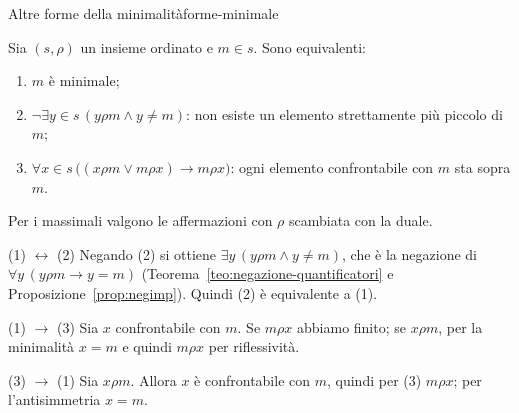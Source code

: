 \begin{concetto}
\begin{Proposizione}{Altre forme della minimalità}{forme-minimale}
    \begin{prerequisiti}
    \end{prerequisiti}
    Sia $(s, \rho)$ un insieme ordinato e $m \in s$. Sono equivalenti:
    \begin{enumerate}
        \item $m$ è minimale;
        \item $\neg\exists y \in s\,(y \rho m \wedge y \neq m)$: non esiste un elemento strettamente più piccolo di $m$;
        \item $\forall x \in s\,\big((x \rho m \vee m \rho x) \rightarrow m \rho x\big)$: ogni elemento confrontabile con $m$ sta sopra $m$.
    \end{enumerate}
    Per i massimali valgono le affermazioni con $\rho$ scambiata con la duale.
\end{Proposizione}
\begin{dimostrazione}
    \begin{caso}{(1) $\leftrightarrow$ (2)}
        Negando (2) si ottiene $\exists y\,(y \rho m \wedge y \neq m)$, che è la negazione di $\forall y\,(y \rho m \rightarrow y = m)$
        (Teorema~\ref{teo:negazione-quantificatori} e Proposizione~\ref{prop:negimp}). Quindi (2) è equivalente a (1).
    \end{caso}
    \begin{caso}{(1) $\rightarrow$ (3)}
        Sia $x$ confrontabile con $m$. Se $m \rho x$ abbiamo finito; se $x \rho m$, per la minimalità $x = m$ e quindi $m \rho x$ per riflessività.
    \end{caso}
    \begin{caso}{(3) $\rightarrow$ (1)}
        Sia $x \rho m$. Allora $x$ è confrontabile con $m$, quindi per (3) $m \rho x$; per l'antisimmetria $x = m$.
    \end{caso}
\end{dimostrazione}
\end{concetto}

